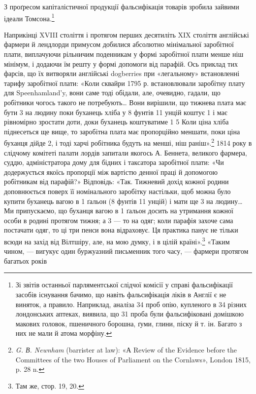 З проґресом капіталістичної продукції фальсифікація
товарів зробила зайвими ідеали Томсона.\footnote{
Зі звітів останньої парляментської слідчої комісії у справі фальсифікації
засобів існування бачимо, що навіть фальсифікація ліків в
Англії є не виняток, а правило. Наприклад, аналіза 34 проб опію, купленого
в 34 різних лондонських аптеках, виявила, що 31 проба були фальсифіковані
домішкою макових головок, пшеничного борошна, ґуми,
глини, піску й т. ін. Багато з них не мали й атома морфіну.
}

Наприкінці XVIII століття і протягом перших десятиліть
XIX століття англійські фармери й лендлорди примусом добилися
абсолютно мінімальної заробітної плати, виплачуючи рільничим
поденникам у формі заробітної плати менше ніш мінімум,
і додаючи їм решту у формі допомоги від парафій. Ось приклад
тих фарсів, що їх витворяли англійські dogberries при «легальному»
встановленні тарифу заробітної плати: «Коли сквайри
1795 р. встановлювали заробітну плату для Speenhamland’y,
вони саме тоді обідали, але, очевидно, гадали, що робітники
чогось такого не потребують\dots{} Вони вирішили, що тижнева
плата має бути 3 на людину поки буханець хліба
у 8 фунтів 11 унцій коштує 1 і має рівномірно зростати
доти, доки буханець коштуватиме 1 5
Коли ціна хліба піднесеться ще вище, то заробітна плата
має пропорційно меншати, поки ціна буханця дійде 2,
і тоді харчі робітника будуть на  менші, ніш раніш».\footnote{
\emph{G. В. Newnham} (barrister at law): «А Review of the Evidence
before the Committees of the two Houses of Parliament on the Cornlaws»,
London 1815, p. 28 n.
}
1814 року в слідчому комітеті палати лордів запитали якогось
А. Беннета, великого фармера, суддю, адміністратора дому для
бідних і таксатора заробітної плати: «Чи додержується якоїсь
пропорції між вартістю денної праці й допомогою робітникам
від парафій?» Відповідь: «Так. Тижневий дохід кожної родини
доповнюється поверх її номінального заробітку настільки, щоб
можна було купити буханець вагою в 1 ґальон (8 фунтів 11 унцій)
і мати ще 3 на людину\dots{} Ми припускаємо, що буханця
вагою в 1 ґальон досить на утримання кожної особи в родині
протягом тижня; а 3 — то на одяг; коли парафія захоче
сама постачати одяг, то ці три пенси вона відраховує. Ця практика
панує не тільки всюди на захід від Вілтшіру, але, на мою
думку, і в цілій країні».\footnote{
Там же, стор. 19, 20.
} «Таким чином, — вигукує один буржуазний
письменник того часу, — фармери протягом багатьох років

